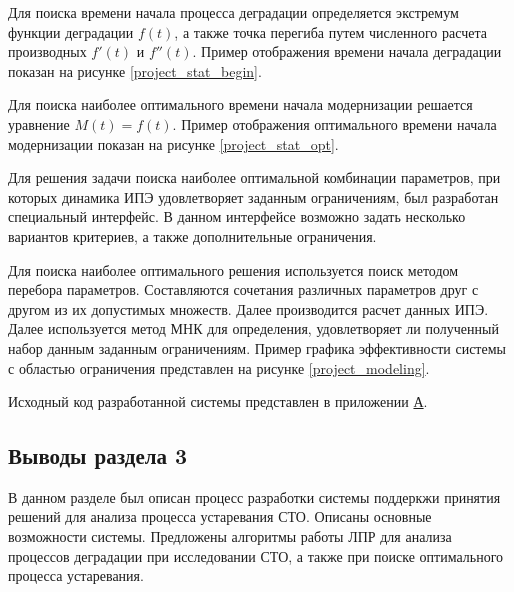 Для поиска времени начала процесса деградации определяется экстремум функции деградации $f(t)$, 
а также точка перегиба путем численного расчета производных $f'(t)$ и $f''(t)$.
Пример отображения времени начала деградации показан на рисунке \ref{project_stat_begin}.


Для поиска наиболее оптимального времени начала модернизации решается уравнение $M(t)=f(t)$. 
Пример отображения оптимального времени начала модернизации показан на рисунке \ref{project_stat_opt}.

 
Для решения задачи поиска наиболее оптимальной комбинации параметров, при которых динамика ИПЭ удовлетворяет заданным ограничениям, был разработан специальный интерфейс. 
В данном интерфейсе возможно задать несколько вариантов критериев, а также дополнительные ограничения.

Для поиска наиболее оптимального решения используется поиск методом перебора параметров. 
Составляются сочетания различных параметров друг с другом из их допустимых множеств. 
Далее производится расчет данных ИПЭ. 
Далее используется метод МНК для определения, удовлетворяет ли полученный набор данным заданным ограничениям.
Пример графика эффективности системы с областью ограничения представлен на рисунке \ref{project_modeling}.


Исходный код разработанной системы представлен в приложении \hyperlink{app-a}{А}.

\subsection*{Выводы раздела 3}
В данном разделе был описан процесс разработки системы поддеркжи принятия решений для анализа процесса устаревания СТО.
Описаны основные возможности системы. 
Предложены алгоритмы работы ЛПР для анализа процессов деградации при исследовании СТО, а также при поиске оптимального процесса устаревания.


